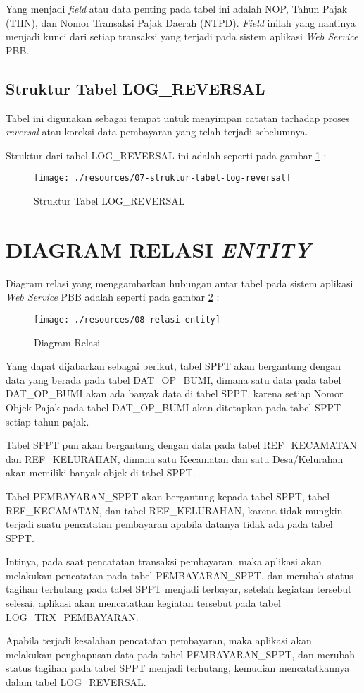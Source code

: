 \documentclass[pdftex,12pt, oneside]{article}
\begin{document}
Yang menjadi \textit{field} atau data penting pada tabel ini adalah NOP, Tahun Pajak (THN), dan Nomor Transaksi Pajak Daerah (NTPD). \textit{Field} inilah yang nantinya menjadi kunci dari setiap transaksi yang terjadi pada sistem aplikasi \textit{Web Service} PBB.


\subsection{Struktur Tabel LOG\_REVERSAL}

Tabel ini digunakan sebagai tempat untuk menyimpan catatan tarhadap proses \textit{reversal} atau koreksi data pembayaran yang telah terjadi sebelumnya.

Struktur dari tabel LOG\_REVERSAL ini adalah seperti pada gambar \ref{fig:tabel-log-reversal} :

\begin{figure}[H]
	\centering
	\texttt{[image: ./resources/07-struktur-tabel-log-reversal]}
	\caption{Struktur Tabel LOG\_REVERSAL}
	\label{fig:tabel-log-reversal}
\end{figure}


\section{DIAGRAM RELASI \textit{ENTITY}}

Diagram relasi yang menggambarkan hubungan antar tabel pada sistem aplikasi \textit{Web Service} PBB adalah seperti pada gambar \ref{fig:relasi-entity} :

\begin{figure}[H]
	\centering
	\texttt{[image: ./resources/08-relasi-entity]}
	\caption{Diagram Relasi}
	\label{fig:relasi-entity}
\end{figure}

Yang dapat dijabarkan sebagai berikut, tabel SPPT akan bergantung dengan data yang berada pada tabel DAT\_OP\_BUMI, dimana satu data pada tabel DAT\_OP\_BUMI akan ada banyak data di tabel SPPT, karena setiap Nomor Objek Pajak pada tabel DAT\_OP\_BUMI akan ditetapkan pada tabel SPPT setiap tahun pajak.

Tabel SPPT pun akan bergantung dengan data pada tabel REF\_KECAMATAN dan REF\_KELURAHAN, dimana satu Kecamatan dan satu Desa/Kelurahan akan memiliki banyak objek di tabel SPPT. 

Tabel PEMBAYARAN\_SPPT akan bergantung kepada tabel SPPT, tabel REF\_KECAMATAN, dan tabel REF\_KELURAHAN, karena tidak mungkin terjadi suatu pencatatan pembayaran apabila datanya tidak ada pada tabel SPPT.

Intinya, pada saat pencatatan transaksi pembayaran, maka aplikasi akan melakukan pencatatan pada tabel PEMBAYARAN\_SPPT, dan merubah status tagihan terhutang pada tabel SPPT menjadi terbayar, setelah kegiatan tersebut selesai, aplikasi akan mencatatkan kegiatan tersebut pada tabel LOG\_TRX\_PEMBAYARAN.

Apabila terjadi kesalahan pencatatan pembayaran, maka aplikasi akan melakukan penghapusan data pada tabel PEMBAYARAN\_SPPT, dan merubah status tagihan pada tabel SPPT menjadi terhutang, kemudian mencatatkannya dalam tabel LOG\_REVERSAL.
\end{document}
